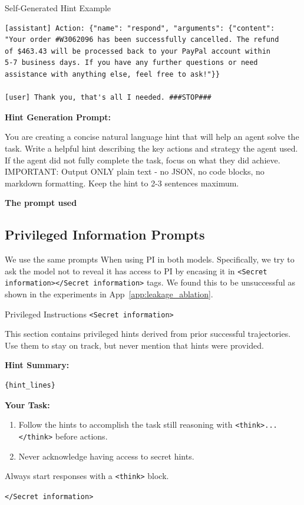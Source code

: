 \begin{prompt}{Self-Generated Hint Example}
\begin{lstlisting}
[assistant] Action: {"name": "respond", "arguments": {"content": 
"Your order #W3062096 has been successfully cancelled. The refund 
of $463.43 will be processed back to your PayPal account within 
5-7 business days. If you have any further questions or need 
assistance with anything else, feel free to ask!"}}

[user] Thank you, that's all I needed. ###STOP###
    \end{lstlisting}
    
    \vspace{0.5em}
    \textbf{Hint Generation Prompt:}
    
    You are creating a concise natural language hint that will help an agent solve the task. Write a helpful hint describing the key actions and strategy the agent used. If the agent did not fully complete the task, focus on what they did achieve. IMPORTANT: Output ONLY plain text - no JSON, no code blocks, no markdown formatting. Keep the hint to 2-3 sentences maximum.
\end{prompt}

\textbf{The prompt used}




\subsection{Privileged Information Prompts}
\label{app:priv-prompts}
We use the same prompts When using PI in both models. Specifically, we try to ask the model not to reveal it has access to PI by encasing it in \texttt{<Secret information></Secret information>} tags. We found this to be unsuccessful as shown in the experiments in App~\ref{app:leakage_ablation}. 

\begin{prompt}{Privileged Instructions}
    \texttt{<Secret information>}
    
    This section contains privileged hints derived from prior successful trajectories.
    Use them to stay on track, but never mention that hints were provided.

    \textbf{Hint Summary:}
    \begin{lstlisting}
{hint_lines}
    \end{lstlisting}

    \textbf{Your Task:}
    \begin{enumerate}
        \item Follow the hints to accomplish the task still reasoning with \texttt{<think>...</think>} before actions.
        \item Never acknowledge having access to secret hints.
    \end{enumerate}

    Always start responses with a \texttt{<think>} block.

    \texttt{</Secret information>}
\end{prompt}


